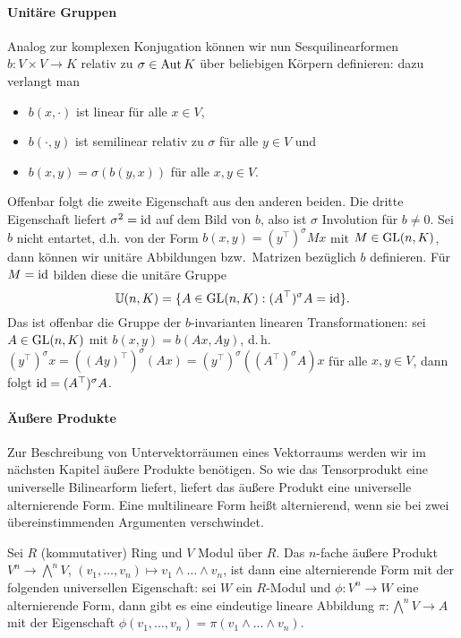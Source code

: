 \paragraph{Unitäre Gruppen} Analog zur komplexen Konjugation können wir nun Sesquilinearformen $b: V \times V \to K$ relativ zu $\sigma \in \operatorname{Aut} K$ über beliebigen Körpern definieren: dazu verlangt man
\begin{itemize}
\item $b(x, \cdot)$ ist linear für alle $x \in V$,
\item $b(\cdot, y)$ ist semilinear relativ zu $\sigma$ für alle $y \in V$ und
\item $b(x,y) = \sigma(b(y,x))$ für alle $x,y \in V$.
\end{itemize}
Offenbar folgt die zweite Eigenschaft aus den anderen beiden. Die dritte Eigenschaft liefert $\sigma^2 = \operatorname{id}$ auf dem Bild von $b$, also ist $\sigma$ Involution für $b \neq 0$. Sei $b$ nicht entartet, d.h. von der Form $b(x,y) = (y^\top)^\sigma M x$ mit $M \in \mathrm{GL}(n,K)$, dann können wir unitäre Abbildungen bzw.~Matrizen bezüglich $b$ definieren. Für $M = \operatorname{id}$ bilden diese die unitäre Gruppe
\begin{equation}
\mathbb U(n,K) = \{ A \in \mathrm{GL}(n,K): (A^\top)^\sigma A = \operatorname{id} \}.
\end{equation}
Das ist offenbar die Gruppe der $b$-invarianten linearen Transformationen: sei $A \in \mathrm{GL}(n,K)$ mit $b(x,y) = b(Ax,Ay)$, d.\,h. $(y^\top)^\sigma x = ((Ay)^\top)^\sigma (Ax) = (y^\top)^\sigma ((A^\top)^\sigma A) x$ für alle $x, y \in V$, dann folgt $\operatorname{id} = (A^\top)^\sigma A$.

\paragraph{Äußere Produkte} Zur Beschreibung von Untervektorräumen eines Vektorraums werden wir im nächsten Kapitel äußere Produkte benötigen. So wie das Tensorprodukt eine universelle Bilinearform liefert, liefert das äußere Produkt eine universelle alternierende Form. Eine multilineare Form heißt alternierend, wenn sie bei zwei übereinstimmenden Argumenten verschwindet.

\begin{defin}
Sei $R$ (kommutativer) Ring und $V$ Modul über $R$. Das $n$-fache äußere Produkt $V^n \to \bigwedge^n V$, $(v_1, \dots, v_n) \mapsto v_1 \wedge \dots \wedge v_n$, ist dann eine alternierende Form mit der folgenden universellen Eigenschaft: sei $W$ ein $R$-Modul und $\phi: V^n \to W$ eine alternierende Form, dann gibt es eine eindeutige lineare Abbildung $\pi: \bigwedge^n V \to A$ mit der Eigenschaft $\phi(v_1, \dots, v_n) = \pi(v_1 \wedge \dots \wedge v_n)$.
\end{defin}

